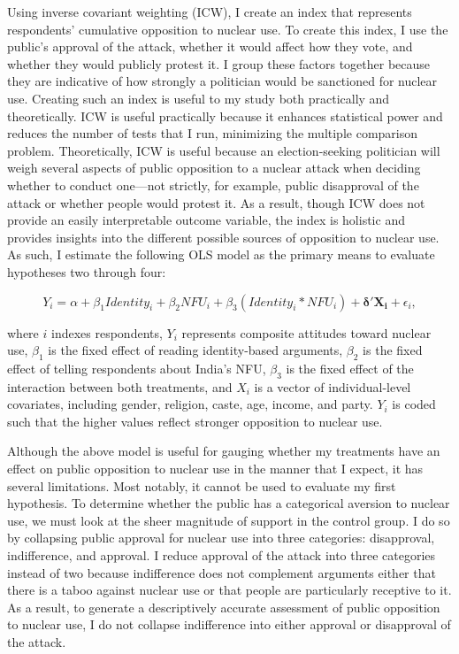 \documentclass[12pt]{article}
\begin{document}
Using inverse covariant weighting (ICW), I create an index that represents respondents' cumulative opposition to nuclear use. To create this index, I use the public's approval of the attack, whether it would affect how they vote, and whether they would publicly protest it. I group these factors together because they are indicative of how strongly a politician would be sanctioned for nuclear use. Creating such an index is useful to my study both practically and theoretically. ICW is useful practically because it enhances statistical power and reduces the number of tests that I run, minimizing the multiple comparison problem. Theoretically, ICW is useful because an election-seeking politician will weigh several aspects of public opposition to a nuclear attack when deciding whether to conduct one—not strictly, for example, public disapproval of the attack or whether people would protest it. As a result, though ICW does not provide an easily interpretable outcome variable, the index is holistic and provides insights into the different possible sources of opposition to nuclear use. As such, I estimate the following OLS model as the primary means to evaluate hypotheses two through four:

\begin{equation}
Y_i=\alpha+\beta_1Identity_i+\beta_2NFU_i+\beta_3(Identity_i*NFU_i)+\mathbf{\delta'X_i} +\epsilon_{i},
\end{equation}

\noindent
where $i$ indexes respondents, $Y_i$ represents composite attitudes toward nuclear use, $\beta_1$ is the fixed effect of reading identity-based arguments, $\beta_2$ is the fixed effect of telling respondents about India's NFU, $\beta_3$ is the fixed effect of the interaction between both treatments, and $X_i$ is a vector of individual-level covariates, including gender, religion, caste, age, income, and party. $Y_i$ is coded such that the higher values reflect stronger opposition to nuclear use.

Although the above model is useful for gauging whether my treatments have an effect on public opposition to nuclear use in the manner that I expect, it has several limitations. Most notably, it cannot be used to evaluate my first hypothesis. To determine whether the public has a categorical aversion to nuclear use, we must look at the sheer magnitude of support in the control group. I do so by collapsing public approval for nuclear use into three categories: disapproval, indifference, and approval. I reduce approval of the attack into three categories instead of two because indifference does not complement arguments either that there is a taboo against nuclear use or that people are particularly receptive to it. As a result, to generate a descriptively accurate assessment of public opposition to nuclear use, I do not collapse indifference into either approval or disapproval of the attack.
\end{document}
